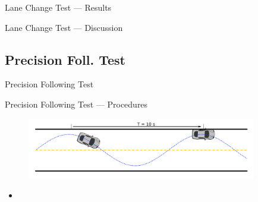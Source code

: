 \documentclass{beamer}
\begin{document}
    \begin{frame}{Lane Change Test --- Results}
    \end{frame}

    \begin{frame}{Lane Change Test --- Discussion}
    \end{frame}


  \subsection{Precision Foll. Test}

    \begin{frame}{Precision Following Test}
    \end{frame}

    \begin{frame}{Precision Following Test --- Procedures}
      \begin{figure}
        \includegraphics[width=10cm]{../graphics/precision_following_diagram.png}
      \end{figure}   
      \begin{itemize}
        \item 
      \end{itemize}
    \end{frame}
\end{document}
